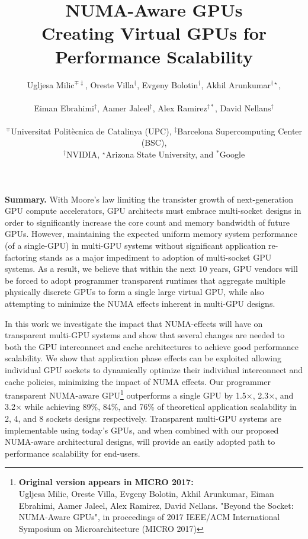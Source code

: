 \documentclass{sig-alternate}
\title{NUMA-Aware GPUs\\Creating Virtual GPUs for Performance Scalability}
\author{
Ugljesa Milic$^{\mp\ddagger}$,
Oreste Villa$^{\dagger}$,
Evgeny Bolotin$^{\dagger}$,
Akhil Arunkumar$^{\dagger\star}$,\\\\
Eiman Ebrahimi$^{\dagger}$,
Aamer Jaleel$^{\dagger}$,
Alex Ramirez$^{\dagger\ast}$,
David Nellans$^{\dagger}$
\\\\
$^{\mp}$Universitat Polit\`ecnica de Catalinya (UPC), $^{\ddagger}$Barcelona Supercomputing Center (BSC), \\
$^{\dagger}$NVIDIA, $^{\star}$Arizona State University, and $^{\ast}$Google\\
}
\begin{document}
\maketitle
\pagestyle{plain}

\textbf{Summary.} With Moore's law limiting the transister growth of 
next-generation GPU compute accelerators,  GPU architects must
embrace multi-socket designs in order to significantly increase the core count and memory 
bandwidth of future GPUs. However, maintaining the expected uniform memory 
system performance (of a single-GPU) in multi-GPU systems without significant 
application re-factoring stands as a major impediment to adoption of multi-socket GPU
systems. As a result, we believe that within the next 10 
years, GPU vendors will be forced to adopt programmer transparent runtimes that 
aggregate multiple physically discrete GPUs to form a single large virtual 
GPU, while also attempting to minimize the NUMA effects inherent in multi-GPU designs.

In this work we investigate the impact that NUMA-effects will have on 
transparent multi-GPU systems and show that several changes are needed to 
both the GPU interconnect and cache architectures to achieve good performance 
scalability. We show that application phase effects can be exploited allowing 
individual GPU sockets to dynamically optimize their individual interconnect and cache 
policies, minimizing the impact of NUMA effects. Our programmer transparent NUMA-aware 
GPU\footnote{\textbf{Original version appears in MICRO 2017:} \\ Ugljesa Milic, 
Oreste Villa, Evgeny Bolotin, Akhil Arunkumar, Eiman Ebrahimi, Aamer Jaleel, 
Alex Ramirez, David Nellans. "Beyond the Socket: NUMA-Aware GPUs", in 
proceedings of 2017 IEEE/ACM International Symposium on Microarchitecture (MICRO 
2017)} outperforms a single GPU by 1.5$\times$, 2.3$\times$, and 3.2$\times$ 
while achieving 89\%, 84\%, and 76\% of theoretical application scalability in 
2, 4, and 8 sockets designs respectively. Transparent multi-GPU systems are 
implementable using today's GPUs, and when combined with our proposed 
NUMA-aware architectural designs, will provide an easily adopted path to 
performance scalability for end-users.
\end{document}
